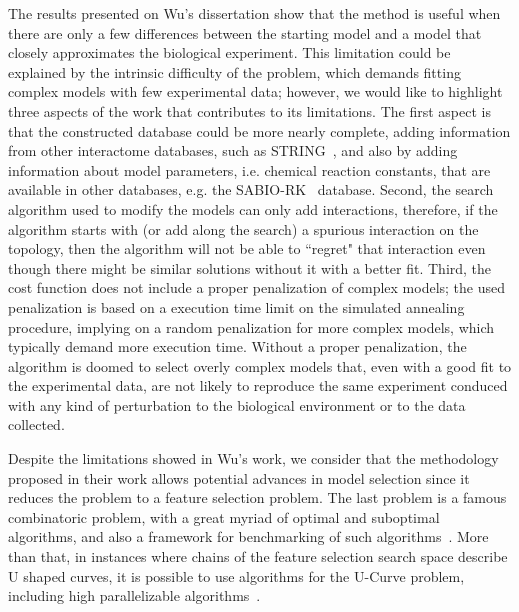 The results presented on Wu's dissertation show that the method is 
useful when there are only a few differences between the starting model
and a model that closely approximates the biological experiment. This
limitation could be explained by the intrinsic difficulty of the 
problem, which demands fitting complex models with few experimental 
data; however, we would like to highlight three aspects of the work that 
contributes to its limitations. The first aspect is that the constructed 
database could be more nearly complete, adding information from other 
interactome databases, such as STRING~\cite{Szklarczyk2010}, and also by 
adding information about model parameters, i.e. chemical reaction 
constants, that are available in other databases, e.g. the 
SABIO-RK~\cite{Wittig2011} database. Second, the search algorithm used
to modify the models can only add interactions, therefore, if the 
algorithm starts with (or add along the search) a spurious interaction 
on the topology, then the algorithm will not be able to ``regret" that 
interaction even though there might be similar solutions without it with a
better fit. Third, the cost function does not include a proper 
penalization of complex models; the used penalization is based on a 
execution time limit on the simulated annealing procedure, implying on a 
random penalization for more complex models, which typically demand more 
execution time. Without a proper penalization, the algorithm is doomed 
to select overly complex models that, even with a good fit to the 
experimental data, are not likely to reproduce the same experiment
conduced with any kind of perturbation to the biological environment or 
to the data collected.

Despite the limitations showed in Wu's work, we consider that the
methodology proposed in their work allows potential advances in model
selection since it reduces the problem to a feature selection problem.
The last problem is a famous combinatoric problem, with a great myriad
of optimal and suboptimal algorithms, and also a framework for
benchmarking of such algorithms~\cite{REIS2017193}. More than that, in 
instances where chains of the feature selection search space describe U 
shaped curves, it is possible to use algorithms for the U-Curve problem, 
including high parallelizable algorithms~\cite{Estrela2020}.

